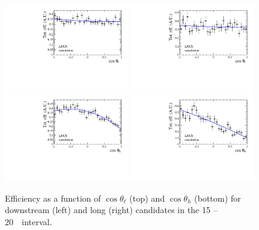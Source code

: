 \begin{figure}[h]
\centering
\includegraphics[width=0.48\textwidth]{Lmumu/figs/efficiencies/angular/DDeffFit_q2_1500_2000.pdf}
\includegraphics[width=0.48\textwidth]{Lmumu/figs/efficiencies/angular/LLeffFit_q2_1500_2000.pdf}
\includegraphics[width=0.48\textwidth]{Lmumu/figs/efficiencies/angular/DDeffFitB_q2_1500_2000.pdf}
\includegraphics[width=0.48\textwidth]{Lmumu/figs/efficiencies/angular/LLeffFitB_q2_1500_2000.pdf}
\caption{Efficiency as a function of $\cos\theta_\ell$ (top) and $\cos\theta_h$ (bottom) for
downstream (left) and long (right) candidates in the 15 -- 20~\gevgevcccc ~\qsq interval.  }
\label{fig:angular_eff}
\end{figure}
%
